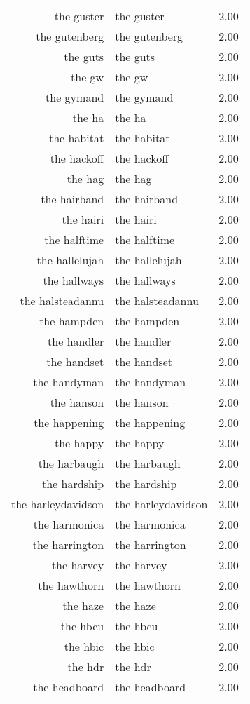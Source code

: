 \begin{table}[ht]
\begin{tabular}{rlr}
  the guster & the guster & 2.00 \\ 
  the gutenberg & the gutenberg & 2.00 \\ 
  the guts & the guts & 2.00 \\ 
  the gw & the gw & 2.00 \\ 
  the gymand & the gymand & 2.00 \\ 
  the ha & the ha & 2.00 \\ 
  the habitat & the habitat & 2.00 \\ 
  the hackoff & the hackoff & 2.00 \\ 
  the hag & the hag & 2.00 \\ 
  the hairband & the hairband & 2.00 \\ 
  the hairi & the hairi & 2.00 \\ 
  the halftime & the halftime & 2.00 \\ 
  the hallelujah & the hallelujah & 2.00 \\ 
  the hallways & the hallways & 2.00 \\ 
  the halsteadannu & the halsteadannu & 2.00 \\ 
  the hampden & the hampden & 2.00 \\ 
  the handler & the handler & 2.00 \\ 
  the handset & the handset & 2.00 \\ 
  the handyman & the handyman & 2.00 \\ 
  the hanson & the hanson & 2.00 \\ 
  the happening & the happening & 2.00 \\ 
  the happy & the happy & 2.00 \\ 
  the harbaugh & the harbaugh & 2.00 \\ 
  the hardship & the hardship & 2.00 \\ 
  the harleydavidson & the harleydavidson & 2.00 \\ 
  the harmonica & the harmonica & 2.00 \\ 
  the harrington & the harrington & 2.00 \\ 
  the harvey & the harvey & 2.00 \\ 
  the hawthorn & the hawthorn & 2.00 \\ 
  the haze & the haze & 2.00 \\ 
  the hbcu & the hbcu & 2.00 \\ 
  the hbic & the hbic & 2.00 \\ 
  the hdr & the hdr & 2.00 \\ 
  the headboard & the headboard & 2.00 \\ 

\end{tabular}
\end{table}
